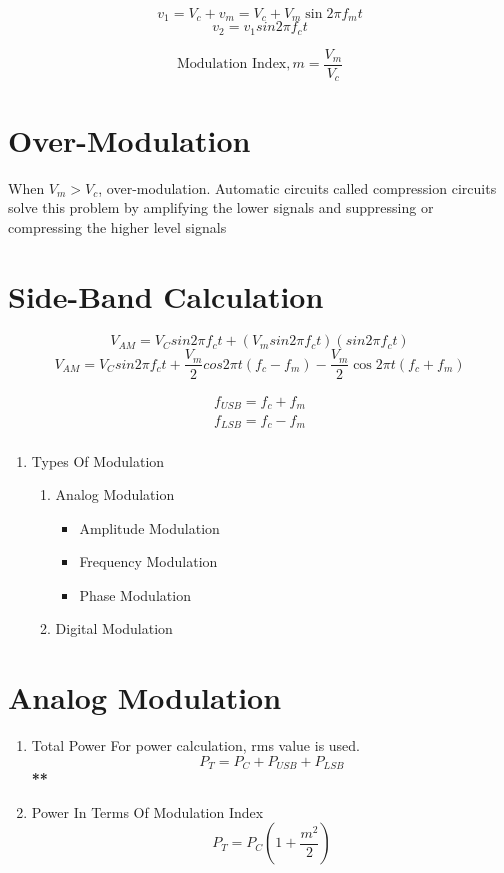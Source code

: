 \documentclass[11pt]{report}
\begin{document}
$$v_1 = V_c + v_m = V_c + V_m \sin{2 \pi f_m t}$$
$$v_{2} = v_{1} sin 2\pi f_ct$$

$$\text{Modulation Index}, m = \frac{V_m}{V_c}$$
\section{Over-Modulation}
\label{sec:org1b53222}
When \(V_m > V_{c}\), over-modulation. Automatic circuits called compression circuits solve this problem by amplifying the lower signals and suppressing or compressing the higher level signals
\section{Side-Band Calculation}
\label{sec:org68cdac4}
$$V_{AM} = V_C sin 2 \pi f_c t + (V_m sin 2 \pi f_c t)(sin 2 \pi f_c t)$$
$$V_{AM} = V_C sin 2 \pi f_c t + \frac{V_m}{2} cos 2 \pi t (f_c - f_m) - \frac{V_{m}}{2} \cos 2 \pi t (f_c + f_{m}) $$

\begin{align*}
f_{USB} = f_c + f_m \\
f_{LSB} = f_c - f_m \\
\end{align*}
\begin{enumerate}
\item Types Of Modulation
\label{sec:org34d1b7e}
\begin{enumerate}
\item Analog Modulation
\begin{itemize}
\item Amplitude Modulation
\item Frequency Modulation
\item Phase Modulation
\end{itemize}
\item Digital Modulation
\end{enumerate}
\end{enumerate}
\section{Analog Modulation}
\label{sec:org7672938}
\begin{enumerate}
\item Total Power
\label{sec:orgd0ef6a1}
For power calculation, rms value is used.
$$P_T = P_C + P_{USB} + P_{LSB}$$
\textbf{**}
\item Power In Terms Of Modulation Index
\label{sec:org117e346}
$$P_T = P_C(1 + \frac{m^2}{2})$$
\end{enumerate}
\end{document}
